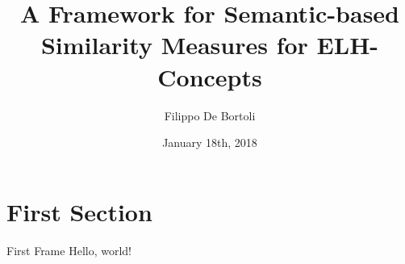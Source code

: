 \documentclass{beamer}
\title{A Framework for Semantic-based Similarity Measures for ELH-Concepts}
\author{Filippo De Bortoli}
\institute{European Master's Programme in Computational Logic, TU Dresden}
\date{January 18th, 2018}
\begin{document}
\maketitle
\section{First Section}
\begin{frame}{First Frame}
Hello, world!
\end{frame}
\end{document}
